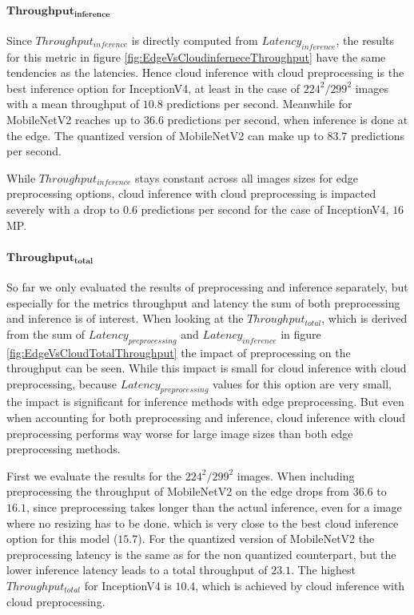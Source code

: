 \paragraph{$\mathbf{Throughput_{inference}}$}
Since $Throughput_{inference}$ is directly computed from $Latency_{inference}$, the results for this metric in figure \ref{fig:EdgeVsCloudinferneceThroughput} have the same tendencies as the latencies.
Hence cloud inference with cloud preprocessing is the best inference option for InceptionV4, at least in the case of $224^2/299^2$ images with a mean throughput of $10.8$ predictions per second.
Meanwhile for MobileNetV2 reaches up to $36.6$ predictions per second, when inference is done at the edge.
The quantized version of MobileNetV2 can make up to $83.7$ predictions per second.

While $Throughput_{inference}$ stays constant across all images sizes for edge preprocessing options, cloud inference with cloud preprocessing is impacted severely with a drop to $0.6$ predictions per second for the case of InceptionV4, $16$MP.


\paragraph{$\mathbf{Throughput_{total}}$}
So far we only evaluated the results of preprocessing and inference separately, but especially for the metrics throughput and latency the sum of both preprocessing and inference is of interest.%
When looking at the $Throughput_{total}$, which is derived from the sum of $Latency_{preprocessing}$ and $Latency_{inference}$ in figure \ref{fig:EdgeVsCloudTotalThroughput} the impact of preprocessing on the throughput can be seen.
While this impact is small for cloud inference with cloud preprocessing, because $Latency_{preprocessing}$ values for this option are very small, the impact is significant for inference methods with edge preprocessing.
But even when accounting for both preprocessing and inference, cloud inference with cloud preprocessing performs way worse for large image sizes than both edge preprocessing methods.

First we evaluate the results for the $224^2/299^2$ images.
When including preprocessing  the throughput of MobileNetV2 on the edge drops from $36.6$ to $16.1$, since preprocessing takes longer than the actual inference, even for a image where no resizing has to be done.
which is very close to the best cloud inference option for this model ($15.7$).
For the quantized version of MobileNetV2 the preprocessing latency is the same as for the non quantized counterpart, but the lower inference latency leads to a total throughput of $23.1$.
The highest $Throughput_{total}$ for InceptionV4 is $10.4$, which is achieved by cloud inference with cloud preprocessing.

